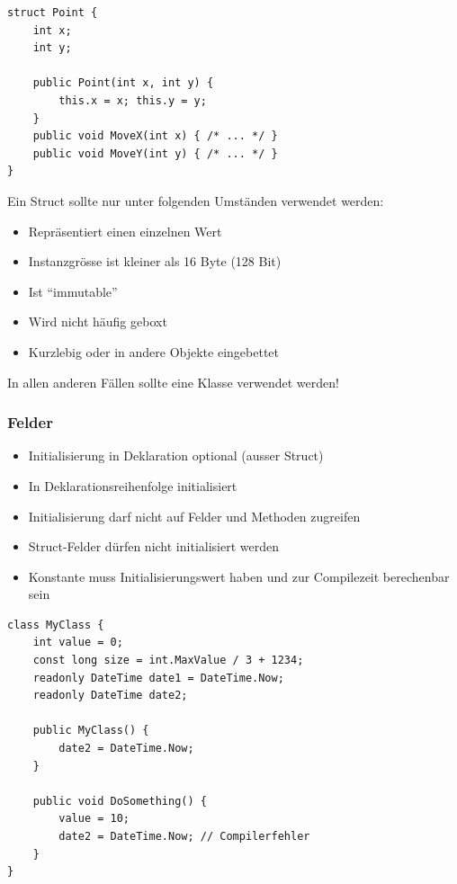 \begin{lstlisting}
struct Point {
    int x;
    int y;

    public Point(int x, int y) {
        this.x = x; this.y = y;
    }
    public void MoveX(int x) { /* ... */ }
    public void MoveY(int y) { /* ... */ }
}
\end{lstlisting}

Ein Struct sollte nur unter folgenden Umständen verwendet werden:
\begin{itemize}
    \item Repräsentiert einen einzelnen Wert
    \item Instanzgrösse ist kleiner als 16 Byte (128 Bit)
    \item Ist “immutable”
    \item Wird nicht häufig geboxt
    \item Kurzlebig oder in andere Objekte eingebettet
\end{itemize}

In allen anderen Fällen sollte eine Klasse verwendet werden!

\subsubsection{Felder}
\begin{itemize}
    \item Initialisierung in Deklaration optional (ausser Struct)
    \item In Deklarationsreihenfolge initialisiert
    \item Initialisierung darf nicht auf Felder und Methoden zugreifen
    \item Struct-Felder dürfen nicht initialisiert werden
    \item Konstante muss Initialisierungswert haben und zur Compilezeit berechenbar sein
\end{itemize}

\begin{lstlisting}
class MyClass {
    int value = 0;
    const long size = int.MaxValue / 3 + 1234;
    readonly DateTime date1 = DateTime.Now;
    readonly DateTime date2;

    public MyClass() {
        date2 = DateTime.Now;
    }

    public void DoSomething() {
        value = 10;
        date2 = DateTime.Now; // Compilerfehler
    }
}
\end{lstlisting}


